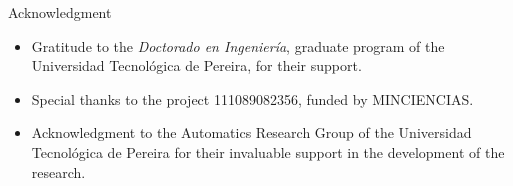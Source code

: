 \begin{frame}{Acknowledgment}
	\begin{block}{}
		\begin{itemize}
			\item Gratitude to the \emph{Doctorado en Ingenier\'ia}, graduate program of the Universidad Tecnológica de Pereira, for their support.
			\item Special thanks to the project 111089082356, funded by MINCIENCIAS.
			\item Acknowledgment to the Automatics Research Group of the Universidad Tecnológica de Pereira for their invaluable support in the development of the research.
		\end{itemize}
	\end{block}
\end{frame}
